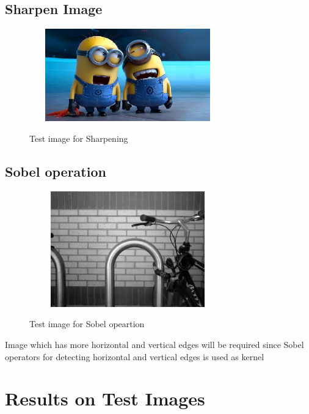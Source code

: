 \documentclass{article}
\begin{document}
\subsection{Sharpen Image}
\begin{figure}[htb]

\begin{minipage}[b]{1.0\linewidth}
  \centering
  \centerline{\includegraphics[width=8.5cm,height=4cm,keepaspectratio]{done.jpg}}
  \centerline{Test image for Sharpening\cite{WEBSITE:17}}\medskip
\end{minipage}
%
\end{figure}


\subsection{Sobel operation}

\begin{figure}[htb]

\begin{minipage}[b]{1.0\linewidth}
  \centering
  \centerline{\includegraphics[width=8.5cm,height=5cm,keepaspectratio]{edge2.jpg}}
  \centerline{Test image for Sobel opeartion\cite{WEBSITE:15}}\medskip
\end{minipage}
%
\end{figure}
Image which has more horizontal and vertical edges will be required since Sobel operators for detecting horizontal and vertical edges is used as kernel

\section{Results on Test Images}
\label{sec:print}
\end{document}
